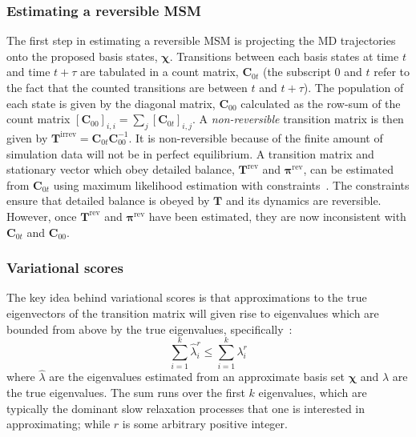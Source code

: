 \documentclass[journal=jacsat,manuscript=article]{achemso}
\begin{document}
\subsubsection{Estimating a reversible MSM}

The first step in estimating a reversible MSM is projecting the MD trajectories onto the proposed basis states, $\bm{\chi}$. Transitions between each basis states at time $t$ and time $t + \tau$ are tabulated in a count matrix, $\mathbf{C}_{0t}$ (the subscript $0$ and $t$ refer to the fact that the counted transitions are between $t$ and $t+\tau$). The population of each state is given by the diagonal matrix, $\mathbf{C}_{00}$ calculated as the row-sum of the count matrix $[\mathbf{C}_{00}]_{i, i} = \sum_j [\mathbf{C}_{0t}]_{i, j}$.  A \emph{non-reversible} transition matrix is then given by $\mathbf{T}^{\mathrm{irrev}} = \mathbf{C}_{0t}\mathbf{C}_{00}^{-1}$. It is non-reversible because of the finite amount of simulation data will not be in perfect equilibrium. A transition matrix and stationary vector which obey detailed balance, $\mathbf{T}^{\mathrm{rev}}$ and $\bm{\pi}^{\mathrm{rev}}$, can be estimated from $\mathbf{C}_{0t}$ using maximum likelihood estimation with constraints~\cite{trendelkamp-schroer_estimation_2015}. The constraints ensure that detailed balance is obeyed by $\mathbf{T}$ and its dynamics are reversible.  However, once $\mathbf{T}^{\mathrm{rev}}$ and $\bm{\pi}^{\mathrm{rev}}$ have been estimated, they are now inconsistent with $\mathbf{C}_{0t}$ and $\mathbf{C}_{00}$. 

\subsubsection{Variational scores}

The key idea behind variational scores is that  approximations to the true eigenvectors of the transition matrix will given rise to eigenvalues which are bounded from above by the true eigenvalues, specifically~\cite{mcgibbonVariationalCrossvalidationSlow2015, wuVariationalApproachLearning2020c}: 
\begin{equation}\label{eqn:var_principle}
    \sum_{i=1}^{k}\hat{\lambda}_{i}^{r} \leq \sum_{i=1}^{k}\lambda_{i}^{r}
\end{equation}
where $\hat{\lambda}$ are the eigenvalues estimated from an approximate basis set $\bm{\chi}$ and $\lambda$ are the true eigenvalues. The sum runs over the first $k$ eigenvalues, which are typically the dominant slow relaxation processes that one is interested in approximating; while $r$ is some arbitrary positive integer\cite{wuVariationalApproachLearning2020c}.
\end{document}
